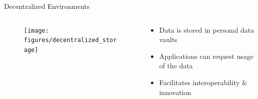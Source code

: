 \begin{frame}{Decentralized Environments}
    \begin{columns}[T] %
        \begin{column}{.48\textwidth}

       \begin{figure}
            \centering
            \texttt{[image: figures/decentralized\_storage]}
        \end{figure}

        \end{column}%
        \hfill%
        \begin{column}{.48\textwidth}
            \bigskip
            \begin{itemize}
                \item Data is stored in personal data vaults
                \item Applications can request usage of the data
                \item Facilitates interoperability \& innovation
            \end{itemize}
        \end{column}%
    \end{columns}
\end{frame}
